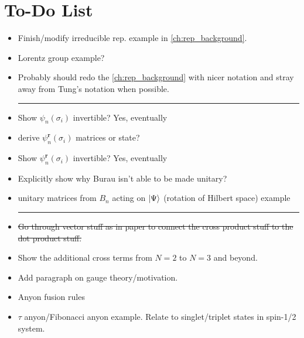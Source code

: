 \chapter{To-Do List}\label{ch:todo}

\begin{itemize}
    \item Finish/modify irreducible rep. example in \cref{ch:rep_background}.
    \item Lorentz group example?
    \item Probably should redo the \cref{ch:rep_background} with nicer notation and stray away from Tung's notation when possible.
    
    \begin{center}\rule{.85\textwidth}{0.65pt}\end{center}
    
    \item Show $\psi_n(\sigma_i)$ invertible? Yes, eventually
    \item derive $\psi_n^\textbf{r}(\sigma_i)$ matrices or state?
    \item Show $\psi_n^\textbf{r}(\sigma_i)$ invertible? Yes, eventually
    \item Explicitly show why Burau isn't able to be made unitary?~\cite{Delaney2016}
    \item unitary matrices from $B_n$ acting on $\ket{\Psi}$ (rotation of Hilbert space) example
    
    \begin{center}\rule{.85\textwidth}{0.65pt}\end{center}
    
    \item \sout{Go through vector stuff as in paper to connect the cross product stuff to the dot product stuff.}
    \item Show the additional cross terms from $N=2$ to $N=3$ and beyond.
    \item Add paragraph on gauge theory/motivation.
    \item Anyon fusion rules
    \item $\tau$ anyon/Fibonacci anyon example. Relate to singlet/triplet states in spin-1/2 system.
\end{itemize}
